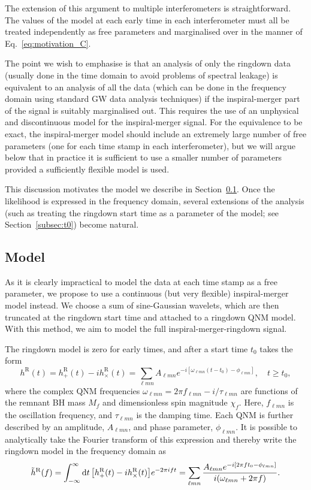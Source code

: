 The extension of this argument to multiple interferometers is straightforward. 
The values of the model at each early time in each interferometer must all be treated independently as free parameters and marginalised over in the manner of Eq.~\ref{eq:motivation_C}.

The point we wish to emphasise is that an analysis of only the ringdown data (usually done in the time domain to avoid problems of spectral leakage) is equivalent to an analysis of all the data (which can be done in the frequency domain using standard GW data analysis techniques) if the inspiral-merger part of the signal is suitably marginalised out. 
This requires the use of an unphysical and discontinuous model for the inspiral-merger signal.
For the equivalence to be exact, the inspiral-merger model should include an extremely large number of free parameters (one for each time stamp in each interferometer), but we will argue below that in practice it is sufficient to use a smaller number of parameters provided a sufficiently flexible model is used.

This discussion motivates the model we describe in Section~\ref{subsec:model}. Once the likelihood is expressed in the frequency domain, several extensions of the analysis (such as treating the ringdown start time as a parameter of the model; see Section~\ref{subsec:t0}) become natural.


\subsection{Model}\label{subsec:model}

As it is clearly impractical to model the data at each time stamp as a free parameter, we propose to use a continuous (but very flexible) inspiral-merger model instead. 
We choose a sum of sine-Gaussian wavelets, which are then truncated at the ringdown start time and attached to a ringdown QNM model. 
With this method, we aim to model the full inspiral-merger-ringdown signal.

The ringdown model is zero for early times, and after a start time $t_0$ takes the form
\begin{equation}\label{ch3:eq:hr}
    h^\mathrm{R}(t) = h_+^\mathrm{R}(t) - ih_\times^\mathrm{R}(t) = \sum_{\ell m n} A_{\ell m n} e^{-i[\omega_{\ell m n}(t-t_0) - \phi_{\ell m n}]}, \quad t \geq t_0,
\end{equation}
where the complex QNM frequencies $\omega_{\ell m n} = 2\pi f_{\ell m n} - i/\tau_{\ell m n}$ are functions of the remnant BH mass $M_f$ and dimensionless spin magnitude $\chi_f$. Here, $f_{\ell m n}$ is the oscillation frequency, and $\tau_{\ell m n}$ is the damping time.
Each QNM is further described by an amplitude, $A_{\ell m n}$, and phase parameter, $\phi_{\ell m n}$. 
It is possible to analytically take the Fourier transform of this expression and thereby write the ringdown model in the frequency domain as
\begin{equation}
    \Tilde{h}^{\mathrm{R}}(f) = \int_{-\infty}^\infty \dd{t} \qty[h_+^\mathrm{R}(t) - ih_\times^\mathrm{R}(t)] e^{-2\pi i f t} = \sum_{\ell m n} \frac{A_{\ell m n} e^{-i[2\pi ft_0 - \phi_{\ell m n}]}}{i(\omega_{\ell m n} + 2\pi f)}.
\end{equation}

